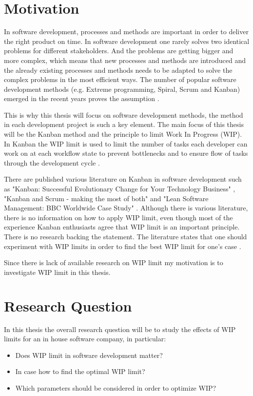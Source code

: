 \documentclass[UKenglish]{ifimaster}  %
\begin{document}
\section{Motivation}
In software development, processes and methods are important in order to deliver the right product on time. In software development one rarely solves two identical problems for different stakeholders. And the problems are getting bigger and more complex, which means that new processes and methods are introduced and the already existing processes and methods needs to be adapted to solve the complex problems in the most efficient ways.  The number of popular software development methods  (e.g. Extreme programming, Spiral, Scrum and Kanban) emerged in the recent years proves the assumption \parencite{gandomani2013important} \parencite{ikonen2010exploring}.

This is why this thesis will focus on software development methods, the method in each development project is such a key element. The main focus of this thesis will be the Kanban method and the principle to limit Work In Progress (WIP). In Kanban the WIP limit is used to  limit the number of tasks each developer can work on at each workflow state to prevent bottlenecks and to ensure flow of tasks through the development cycle \parencite{gandomani2013important} \parencite{ikonen2010exploring}.

There are published various literature on Kanban in software development such as "Kanban: Successful Evolutionary Change for Your Technology Business" \parencite{0984521402}, "Kanban and Scrum - making the most of both"  \parencite{Kniberg} and "Lean Software Management: BBC Worldwide Case Study" \parencite{Joyce}. Although there is various literature, there is no information on how to apply WIP limit, even though most of the experience Kanban enthusiasts agree that WIP limit is an important principle.  There is no research backing the statement.  The literature states that one should experiment with WIP limits in order to find the best WIP limit for one's case \parencite{Ikonen} \parencite{Kniberg}.

Since there is lack of available research on WIP limit my motivation is to investigate WIP limit in this thesis.

\section{Research Question}
\label{chap:RQ}
In this thesis the overall research question will be to study the effects of WIP limits for an in house software company, in particular:
\begin{itemize}
\item Does WIP limit in software development matter?
\item In case how to find the optimal WIP limit?
\item Which parameters should be considered in order to optimize WIP? 
\end{itemize}
\end{document}
